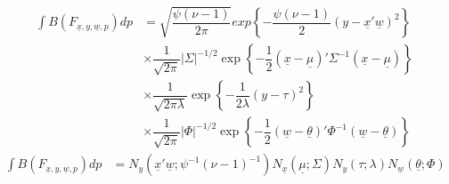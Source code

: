 \documentclass[fleqn]{minimal}
\begin{document}
\begin{align*}
  \int B\left(F_{\underline{x}, y, \underline{w}, p}\right) dp
  & =
  \sqrt{\dfrac{\psi\left(\nu-1\right)}{2\pi}}
  exp
  \left\{
    -\dfrac{\psi\left(\nu-1\right)}{2}
    \left( y - \underline{x}'\underline{w}\right)^2
  \right\}\\ 
  & \times
  \dfrac{1}{\sqrt{2\pi}}
  \left| \Sigma \right|^{-1/2}
  \exp
  \left\{
    - \dfrac{1}{2}
    \left( \underline{x} - \underline{\mu}\right)'
    \Sigma^{-1}
    \left( \underline{x} - \underline{\mu}\right)
  \right\} \\
  & \times
  \dfrac{1}{\sqrt{2\pi\lambda}}
  \exp
  \left\{
    - \dfrac{1}{2\lambda}
    \left(y - \tau\right)^2
  \right\} \\
  & \times
  \dfrac{1}{\sqrt{2\pi}}
  \left| \Phi \right|^{-1/2}
  \exp
  \left\{
    - \dfrac{1}{2}
    \left( \underline{w} - \underline{\theta}\right)'
    \Phi^{-1}
    \left( \underline{w} - \underline{\theta}\right)
  \right\}
\end{align*}
\begin{align*}
  \int B\left(F_{\underline{x}, y, \underline{w}, p}\right) dp
  & =
  N_y\left(\underline{x}'\underline{w} ; \psi^{-1}\left(\nu-1\right)^{-1}\right)
  N_{\underline{x}} \left( \underline{\mu} ; \Sigma\right)
  N_{y} \left( \tau ; \lambda\right)
  N_{\underline{w}} \left( \underline{\theta} ; \Phi\right)
\end{align*}
\end{document}
